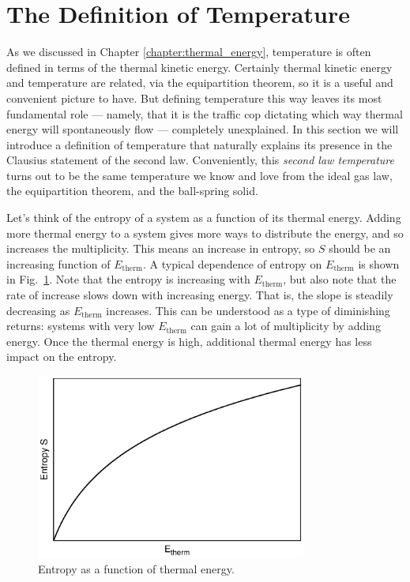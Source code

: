 \section{The Definition of Temperature}

As we discussed in Chapter \ref{chapter:thermal_energy}, 
temperature is often defined in terms of the thermal kinetic energy.
Certainly thermal kinetic energy and temperature are related, via the
equipartition theorem, so it is a useful and convenient picture to
have.  But defining temperature this way leaves its most fundamental
role --- namely, that it is the traffic cop dictating which way
thermal energy will spontaneously flow --- completely unexplained.  In
this section we will introduce a definition of temperature that
naturally explains its presence in the Clausius statement of the
second law.  Conveniently, this {\it second law temperature} turns out
to be the same temperature we know and love from the ideal gas law,
the equipartition theorem, and the ball-spring solid.

Let's think of the entropy of a system as a function of its thermal
energy.  Adding more thermal energy to a system gives more ways to
distribute the energy, and so increases the multiplicity.  This means
an increase in entropy, so $S$ should be an increasing function of
$E_\text{therm}$.  A typical dependence of entropy on $E_\text{therm}$
is shown in Fig.~\ref{fig:entropy_vs_energy}.  Note that the entropy
is increasing with $E_\text{therm}$, but also note that the rate of
increase slows down with increasing energy.  That is, the slope is
steadily decreasing as $E_\text{therm}$ increases.  This can be
understood as a type of diminishing returns: systems with very low
$E_\text{therm}$ can gain a lot of multiplicity by adding energy.
Once the thermal energy is high, additional thermal energy has less
impact on the entropy.

\begin{figure}
\begin{center}
\includegraphics[width=3.5in]{second_law_and_entropy/entropy_vs_energy}
\caption{Entropy as a function of thermal energy.}
\label{fig:entropy_vs_energy}
\end{center}
\end{figure}

